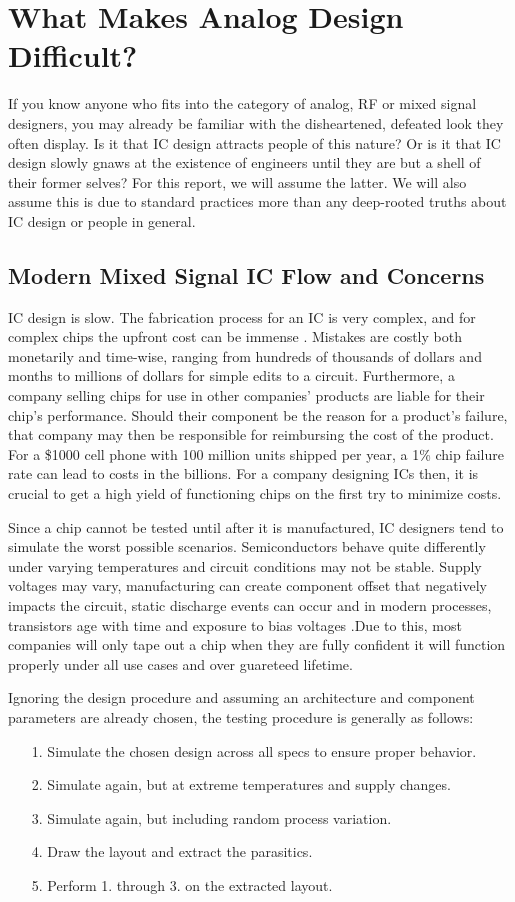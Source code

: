\chapter{What Makes Analog Design Difficult?}

If you know anyone who fits into the category of analog, RF or mixed signal designers, you may already be familiar with the disheartened, defeated look they often display. Is it that IC design attracts people of this nature? Or is it that IC design slowly gnaws at the existence of engineers until they are but a shell of their former selves? For this report, we will assume the latter. We will also assume this is due to standard practices more than any deep-rooted truths about IC design or people in general.

\section{Modern Mixed Signal IC Flow and Concerns}
IC design is slow. The fabrication process for an IC is very complex, and for complex chips the upfront cost can be immense \cite{elder_real_nodate}. Mistakes are costly both monetarily and time-wise, ranging from hundreds of thousands of dollars and months to millions of dollars for simple edits to a circuit. Furthermore, a company selling chips for use in other companies' products are liable for their chip's performance. Should their component be the reason for a product's failure, that company may then be responsible for reimbursing the cost of the product. For a \$1000 cell phone with 100 million units shipped per year, a 1\% chip failure rate can lead to costs in the billions. For a company designing ICs then, it is crucial to get a high yield of functioning chips on the first try to minimize costs.

Since a chip cannot be tested until after it is manufactured, IC designers tend to simulate the worst possible scenarios. Semiconductors behave quite differently under varying temperatures and circuit conditions may not be stable. Supply voltages may vary, manufacturing can create component offset that negatively impacts the circuit, static discharge events can occur and in modern processes, transistors age with time and exposure to bias voltages .Due to this, most companies will only tape out a chip when they are fully confident it will function properly under all use cases and over guareteed lifetime. 

Ignoring the design procedure and assuming an architecture and component parameters are already chosen, the testing procedure is generally as follows:
\begin{itemize}
\item[1.] Simulate the chosen design across all specs to ensure proper behavior.
\item[2.] Simulate again, but at extreme temperatures and supply changes.
\item[3.] Simulate again, but including random process variation.
\item[4.] Draw the layout and extract the parasitics.
\item[5.] Perform 1. through 3. on the extracted layout.
\end{itemize}

